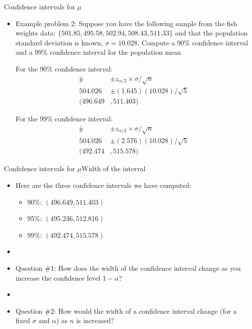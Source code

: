 \documentclass[xcolor=dvipsnames]{beamer}
\begin{document}
\begin{frame}{Confidence intervals for $\mu$}
	\begin{itemize}
		\item Example problem 2: Suppose you have the following sample from the fish weights data: $\{501.85, 495.58, 502.94, 508.43, 511.33 \}$ and that the population standard deviation is known, $\sigma = 10.028$. Compute a 90\% confidence interval and a 99\% confidence interval for the population mean\\  \vspace{8pt}
		
		For the 90\% confidence interval: 
		\begin{align*}
			\bar{y} &\pm z_{\alpha / 2} \times \sigma / \sqrt{n} \\
			504.026 &\pm (1.645)(10.028)/\sqrt{5} \\
			(496.649&, 511.403)
		\end{align*}  \pause
		
		For the 99\% confidence interval: 
		\begin{align*}
		\bar{y} &\pm z_{\alpha / 2} \times \sigma / \sqrt{n} \\
		504.026 &\pm (2.576)(10.028)/\sqrt{5} \\
		(492.474&, 515.578)
		\end{align*}
		
	\end{itemize}
\end{frame}

\begin{frame}{Confidence intervals for $\mu$}{Width of the interval}
	\begin{itemize}
		\item Here are the three confidence intervals we have computed:
		\begin{itemize}
			\item 90\%: $(496.649, 511.403)$
			\item 95\%: $(495.236, 512.816)$
			\item 99\%: $(492.474, 515.578)$
		\end{itemize}  \pause
	\item[]
	\item Question \#1: How does the width of the confidence interval change as you increase the confidence level $1-\alpha$?  \pause
	\item[]
	\item Question \#2: How would the width of a confidence interval change (for a fixed $\sigma$ and $\alpha$) as $n$ is increased?
	\end{itemize}
\end{frame}
\end{document}
